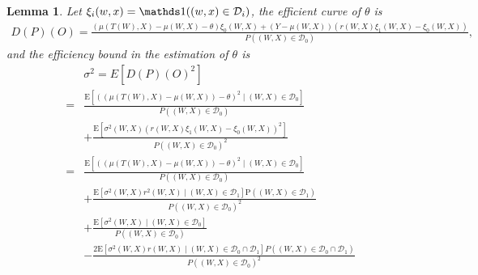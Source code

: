 \documentclass[11pt]{article}
\def\P{{\mathrm P}}
\def\E{{\mathrm E}}
\numberwithin{equation}{section}
\newtheorem{lemma}{Lemma}[section]
\theoremstyle{definition}
\begin{document}
\begin{lemma}\label{lem:efficient}
    Let $\xi_i(w,x)=\ind((w,x)\in\mathcal{D}_i)$, the efficient curve of $\theta$ is 
    \begin{align}
        D(P)(O)=\frac{(\mu(T(W),X)-\mu(W,X)-\theta)\xi_0(W,X)+(Y-\mu(W,X))(r(W,X)\xi_1(W,X)-\xi_0(W,X))}{P((W,X)\in\mathcal{D}_0)},
    \end{align}
    and the efficiency bound in the estimation of $\theta$ is 
    \begin{align*}
        &\sigma^2=E\left[D(P)(O)^2\right]\\
        =&\frac{\E\left[((\mu(T(W),X)-\mu(W,X))-\theta)^2\mid (W,X)\in\mathcal{D}_0\right]}{P((W,X)\in\mathcal{D}_0)}\\&+\frac{\E\left[\sigma^2(W,X)(r(W,X)\xi_1(W,X)-\xi_0(W,X))^2\right]}{P((W,X)\in\mathcal{D}_0)^2}\\
        =&\frac{\E\left[((\mu(T(W),X)-\mu(W,X))-\theta)^2\mid (W,X)\in\mathcal{D}_0\right]}{P((W,X)\in\mathcal{D}_0)}\\&+\frac{\E\left[\sigma^2(W,X)r^2(W,X)\mid (W,X)\in\mathcal{D}_1\right]\P((W,X)\in\mathcal{D}_1)}{P((W,X)\in\mathcal{D}_0)^2}\\&+\frac{\E\left[\sigma^2(W,X)\mid (W,X)\in\mathcal{D}_0\right]}{P((W,X)\in\mathcal{D}_0)}\\&-\frac{2\E\left[\sigma^2(W,X)r(W,X)\mid (W,X)\in\mathcal{D}_0\cap \mathcal{D}_1\right]P((W,X)\in\mathcal{D}_0\cap \mathcal{D}_1)}{P((W,X)\in\mathcal{D}_0)^2}
    \end{align*}
\end{lemma}
\end{document}
